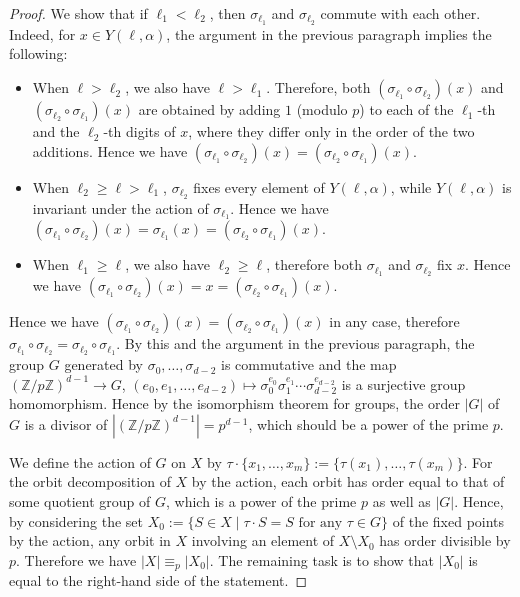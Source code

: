 ﻿\documentclass{article}
\theoremstyle{definition}
\begin{document}
\begin{proof}
    We show that if $\ell_1 < \ell_2$, then $\sigma_{\ell_1}$ and $\sigma_{\ell_2}$ commute with each other.
    Indeed, for $x \in Y(\ell,\alpha)$, the argument in the previous paragraph implies the following:
    \begin{itemize}
        \item When $\ell > \ell_2$, we also have $\ell > \ell_1$.  Therefore, both $(\sigma_{\ell_1} \circ \sigma_{\ell_2})(x)$ and $(\sigma_{\ell_2} \circ \sigma_{\ell_1})(x)$ are obtained by adding $1$ (modulo $p$) to each of the $\ell_1$-th and the $\ell_2$-th digits of $x$, where they differ only in the order of the two additions.  Hence we have $(\sigma_{\ell_1} \circ \sigma_{\ell_2})(x) = (\sigma_{\ell_2} \circ \sigma_{\ell_1})(x)$.
        \item When $\ell_2 \geq \ell > \ell_1$, $\sigma_{\ell_2}$ fixes every element of $Y(\ell,\alpha)$, while $Y(\ell,\alpha)$ is invariant under the action of $\sigma_{\ell_1}$.  Hence we have $(\sigma_{\ell_1} \circ \sigma_{\ell_2})(x) = \sigma_{\ell_1}(x) = (\sigma_{\ell_2} \circ \sigma_{\ell_1})(x)$.
        \item When $\ell_1 \geq \ell$, we also have $\ell_2 \geq \ell$, therefore both $\sigma_{\ell_1}$ and $\sigma_{\ell_2}$ fix $x$.  Hence we have $(\sigma_{\ell_1} \circ \sigma_{\ell_2})(x) = x = (\sigma_{\ell_2} \circ \sigma_{\ell_1})(x)$.
    \end{itemize}
    Hence we have $(\sigma_{\ell_1} \circ \sigma_{\ell_2})(x) = (\sigma_{\ell_2} \circ \sigma_{\ell_1})(x)$ in any case, therefore $\sigma_{\ell_1} \circ \sigma_{\ell_2} = \sigma_{\ell_2} \circ \sigma_{\ell_1}$.
    By this and the argument in the previous paragraph, the group $G$ generated by $\sigma_0,\dots,\sigma_{d-2}$ is commutative and the map $(\mathbb{Z}/p\mathbb{Z})^{d-1} \to G$, $(e_0,e_1,\dots,e_{d-2}) \mapsto \sigma_0^{e_0} \sigma_1^{e_1} \cdots \sigma_{d-2}^{e_{d-2}}$ is a surjective group homomorphism.
    Hence by the isomorphism theorem for groups, the order $|G|$ of $G$ is a divisor of $|(\mathbb{Z}/p\mathbb{Z})^{d-1}| = p^{d-1}$, which should be a power of the prime $p$.

    We define the action of $G$ on $X$ by $\tau \cdot \{x_1,\dots,x_m\} := \{\tau(x_1),\dots,\tau(x_m)\}$.
    For the orbit decomposition of $X$ by the action, each orbit has order equal to that of some quotient group of $G$, which is a power of the prime $p$ as well as $|G|$.
    Hence, by considering the set $X_0 := \{ S \in X \mid \mbox{$\tau \cdot S = S$ for any $\tau \in G$} \}$ of the fixed points by the action, any orbit in $X$ involving an element of $X \setminus X_0$ has order divisible by $p$.
    Therefore we have $|X| \equiv_p |X_0|$.
    The remaining task is to show that $|X_0|$ is equal to the right-hand side of the statement.


\end{proof}
\end{document}
